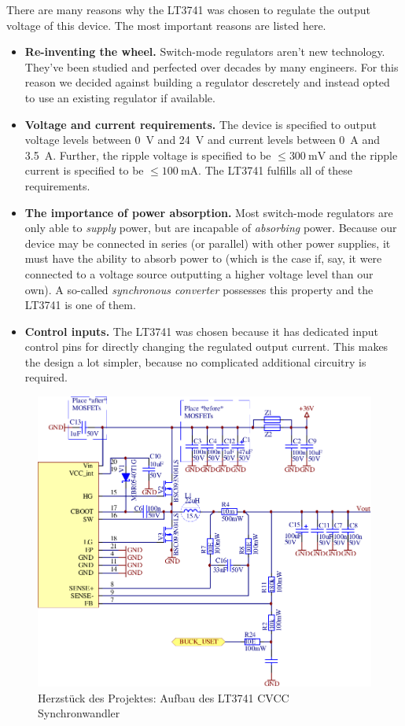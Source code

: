 There are  many reasons why the LT3741 was chosen to regulate the output voltage
of this device. The most important reasons are listed here.
\begin{itemize}
    \item \textbf{Re-inventing the wheel.}
        Switch-mode regulators aren't new technology. They've been studied and perfected
        over decades by many engineers. For  this  reason  we decided against building a
        regulator  descretely  and  instead  opted  to  use  an  existing  regulator  if
        available.
    \item \textbf{Voltage and current requirements.}
        The device is specified to  output  voltage  levels  between  \SI{0}{\volt}  and
        \SI{24}{\volt} and current levels between \SI{0}{\ampere} and \SI{3.5}{\ampere}.
        Further,  the  ripple voltage is specified to be $\le\SI{300}{\milli\volt}$  and
        the ripple current  is  specified to be $\le\SI{100}{\milli\ampere}$. The LT3741
        fulfills all of these requirements.
    \item \textbf{The importance of power absorption.}
        Most switch-mode  regulators  are  only  able  to  \emph{supply}  power, but are
        incapable  of  \emph{absorbing} power. Because our device may  be  connected  in
        series (or parallel) with other power  supplies,  it  must  have  the ability to
        absorb  power  to  (which is the case if, say, it were connected  to  a  voltage
        source   outputting   a   higher  voltage  level  than  our  own).  A  so-called
        \emph{synchronous  converter} possesses this property and the LT3741 is  one  of
        them.
    \item \textbf{Control inputs.}
        The LT3741 was chosen  because  it has dedicated input control pins for directly
        changing  the  regulated  output  current.  This makes the design a lot simpler,
        because no complicated additional circuitry is required.
\end{itemize}

\begin{figure}[th!]
    \center
    \includegraphics[width=.75\textwidth]{images/circuit/buck.pdf}
    \caption{Herzst\"uck des Projektes: Aufbau des LT3741 CVCC Synchronwandler}
    \label{fig:circuit:buck}
\end{figure}


